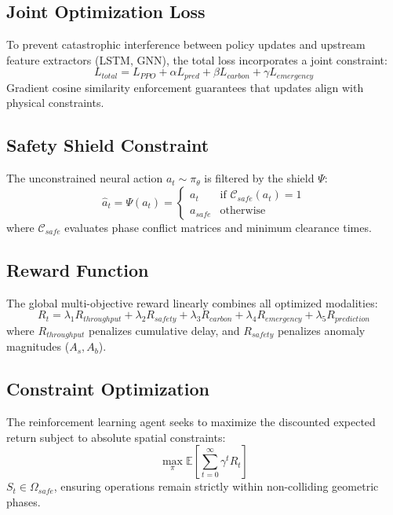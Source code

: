 \documentclass[journal]{IEEEtran}
\begin{document}
\subsection{Joint Optimization Loss}
To prevent catastrophic interference between policy updates and upstream feature extractors (LSTM, GNN), the total loss incorporates a joint constraint:
\begin{equation}
L_{total} = L_{PPO} + \alpha L_{pred} + \beta L_{carbon} + \gamma L_{emergency}
\end{equation}
Gradient cosine similarity enforcement guarantees that updates align with physical constraints.

\subsection{Safety Shield Constraint}
The unconstrained neural action $a_t \sim \pi_\theta$ is filtered by the shield $\Psi$:
\begin{equation}
\hat{a}_t = \Psi(a_t) = 
\begin{cases} 
a_t & \text{if } \mathcal{C}_{safe}(a_t) = 1 \\ 
a_{safe} & \text{otherwise} 
\end{cases}
\end{equation}
where $\mathcal{C}_{safe}$ evaluates phase conflict matrices and minimum clearance times.

\subsection{Reward Function}
The global multi-objective reward linearly combines all optimized modalities:
\begin{equation}
R_t = \lambda_1 R_{throughput} + \lambda_2 R_{safety} + \lambda_3 R_{carbon} + \lambda_4 R_{emergency} + \lambda_5 R_{prediction}
\end{equation}
where $R_{throughput}$ penalizes cumulative delay, and $R_{safety}$ penalizes anomaly magnitudes ($A_s, A_b$).

\subsection{Constraint Optimization}
The reinforcement learning agent seeks to maximize the discounted expected return subject to absolute spatial constraints:
\begin{equation}
\max_{\pi} \mathbb{E} \left[ \sum_{t=0}^{\infty} \gamma^t R_t \right]
\end{equation}
 $S_t \in \Omega_{safe}$, ensuring operations remain strictly within non-colliding geometric phases.
\end{document}
